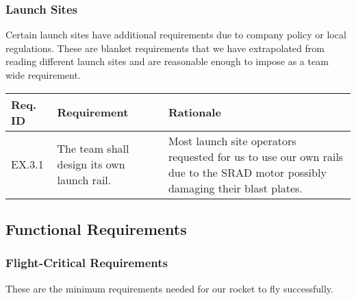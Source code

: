 \subsubsection{Launch Sites}
\noindent
Certain launch sites have additional requirements due to company policy or local regulations. These are blanket requirements that we have extrapolated from reading different launch sites and are reasonable enough to impose as a team wide requirement.

\begin{table}[htbp]
    \footnotesize 
    \setlength{\tymin}{40pt}
    \let\raggedright\RaggedRight
    
    \begin{tabulary}{\textwidth}{@{}LLL@{}}
    \toprule
        \textbf{Req. ID} & \textbf{Requirement} & \textbf{Rationale} \\
    \midrule
        EX.3.1 & The team shall design its own launch rail. & Most launch site operators requested for us to use our own rails due to the SRAD motor possibly damaging their blast plates. \\ 
    \bottomrule
    \end{tabulary}

    \label{table:launch-site-stakeholder}
\end{table}


\subsection{Functional Requirements}
\subsubsection{Flight-Critical Requirements}
These are the minimum requirements needed for our rocket to fly successfully.

